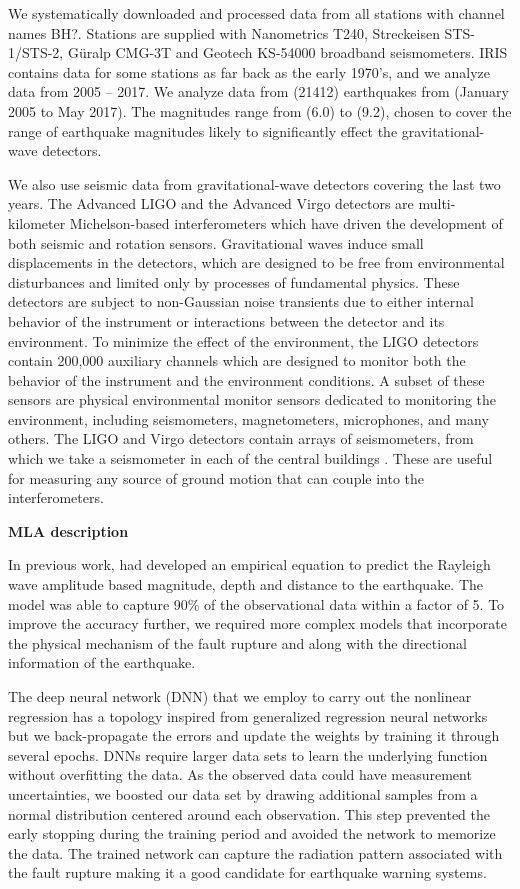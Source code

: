 \documentclass[preprint, aps, showpacs]{revtex4-1}
\newcommand{\rednote}[1]{{\color{red} (#1)}}
\begin{document}
We systematically downloaded and processed data from all stations with channel names BH?. Stations are supplied with Nanometrics T240, Streckeisen STS-1/STS-2, G\"uralp CMG-3T and Geotech KS-54000 broadband seismometers. 
IRIS contains data for some stations as far back as the early 1970's, and we analyze data from 2005 -- 2017.
We analyze data from \rednote{21412} earthquakes from \rednote{January 2005 to May 2017}.
The magnitudes range from \rednote{6.0} to \rednote{9.2}, chosen to cover the range of earthquake magnitudes likely to significantly effect the gravitational-wave detectors.

We also use seismic data from gravitational-wave detectors covering the last two years.
The Advanced LIGO \cite{aligo} and the Advanced Virgo \cite{avirgo}  detectors are multi-kilometer Michelson-based interferometers which have driven the development of both seismic \cite{BeCa2016} and rotation \cite{VeHa2014} sensors.
Gravitational waves induce small displacements in the detectors, which are designed to be free from environmental disturbances and limited only by processes of fundamental physics.
These detectors are subject to non-Gaussian noise transients due to either internal behavior of the instrument or interactions between the detector and its environment. To minimize the effect of the environment, the LIGO detectors contain 200,000 auxiliary channels which are designed to monitor both the behavior of the instrument and the environment conditions.
A subset of these sensors are physical environmental monitor sensors dedicated to monitoring the environment, including seismometers, magnetometers, microphones, and many others.
The LIGO and Virgo detectors contain arrays of seismometers, from which we take a seismometer in each of the central buildings \cite{AbEA2016f}. These are useful for measuring any source of ground motion that can couple into the interferometers.

\textbf{MLA description}

In previous work, \cite{CoEa2017} had developed an empirical equation to predict the Rayleigh wave amplitude based magnitude, depth and distance to the earthquake. The model was able to capture 90\% of the observational data within a factor of 5. To improve the accuracy further, we required more complex models that incorporate the physical mechanism of the fault rupture and along with the directional information of the earthquake. 

The deep neural network (DNN) that we employ to carry out the nonlinear regression has a topology inspired from generalized regression neural networks but we back-propagate the errors and update the weights by training it through several epochs.   DNNs require larger data sets to learn the underlying function without overfitting the data. As the observed data could have measurement uncertainties, we boosted our data set by drawing additional samples from a normal distribution centered around each observation. This step prevented the early stopping during the training period and avoided the network to memorize the data.  The trained network can capture the radiation pattern associated with the fault rupture making it a good candidate for earthquake warning systems. 
\end{document}
